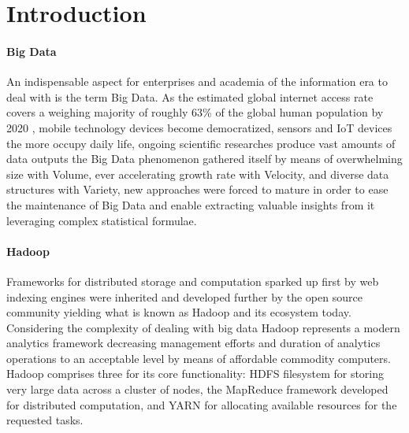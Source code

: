 \documentclass[review]{elsarticle}
\begin{document}
\linenumbers

\section{Introduction}

\paragraph{Big Data}An indispensable aspect for enterprises and academia of the information era to deal with is the term Big Data. As the estimated global internet access rate covers a weighing majority of roughly 63\% of the global human population by 2020 \cite{noauthor_world_nodate}, mobile technology devices become democratized, sensors and IoT devices the more occupy daily life, ongoing scientific researches produce vast amounts of data outputs the Big Data phenomenon gathered itself by means of overwhelming size with Volume, ever accelerating growth rate with Velocity, and diverse data structures with Variety, new approaches were forced to mature in order to ease the maintenance of Big Data and enable extracting valuable insights from it leveraging complex statistical formulae.

\paragraph{Hadoop \cite{noauthor_apache_nodate}}Frameworks for distributed storage and computation sparked up first by web indexing engines were inherited and developed further by the open source community yielding what is known as Hadoop and its ecosystem today. Considering the complexity of dealing with big data Hadoop represents a modern analytics framework decreasing management efforts and duration of analytics operations to an acceptable level by means of affordable commodity computers. Hadoop comprises three for its core functionality: HDFS filesystem for storing very large data across a cluster of nodes, the MapReduce framework developed for distributed computation, and YARN for allocating available resources for the requested tasks.
\end{document}
